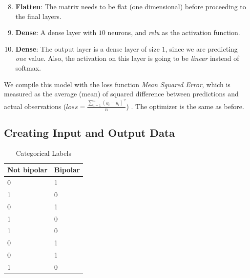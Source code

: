 \begin{enumerate}
      \setcounter{enumi}{7}
      \item \textbf{Flatten}: The matrix needs to be flat (one dimensional) before proceeding to the final layers.
      \item \textbf{Dense}: A dense layer with $10$ neurons, and \textit{relu} as the activation function. 
      \item \textbf{Dense}: The output layer is a dense layer of size $1$, since we are predicting \textit{one} value. 
            Also, the activation on this layer is going to be \textit{linear} instead of softmax.
\end{enumerate}

We compile this model with the loss function \textit{Mean Squared Error}, which is measured as the average (mean) 
of squared difference between predictions and actual observations ($ loss = \frac{\sum_{i=1}^{n}(y_i-\hat{y}_i)^2}{n} $) \cite{loss_functions}. 
The optimizer is the same as before.

\subsection{Creating Input and Output Data}
\begin{table}
  \begin{center}
    \begin{tabular}{| l | l |}
      \hline
      \textbf{Not bipolar} & \textbf{Bipolar}  \\ \hline
      0                    &  1                \\ \hline
      1                    &  0                \\ \hline
      0                    &  1                \\ \hline
      1                    &  0                \\ \hline
      1                    &  0                \\ \hline
      0                    &  1                \\ \hline
      0                    &  1                \\ \hline
      1                    &  0                \\ \hline
    \end{tabular}
    \caption{Categorical Labels}
    \label{table:categorical_labels}
  \end{center}
\end{table}

